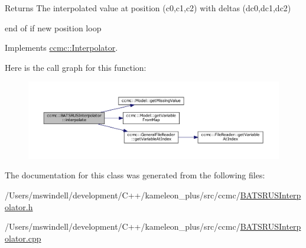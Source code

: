 \begin{DoxyReturn}{Returns}
The interpolated value at position (c0,c1,c2) with deltas (dc0,dc1,dc2) 
\end{DoxyReturn}
end of if new position loop 

Implements \hyperlink{classccmc_1_1_interpolator_aa6b272bd53630020d92938ec1e5cfad9}{ccmc\-::\-Interpolator}.



Here is the call graph for this function\-:
\nopagebreak
\begin{figure}[H]
\begin{center}
\leavevmode
\includegraphics[width=350pt]{classccmc_1_1_b_a_t_s_r_u_s_interpolator_a8bb4e9b10064a516192c771462673b09_cgraph}
\end{center}
\end{figure}




The documentation for this class was generated from the following files\-:\begin{DoxyCompactItemize}
\item 
/\-Users/mswindell/development/\-C++/kameleon\-\_\-plus/src/ccmc/\hyperlink{_b_a_t_s_r_u_s_interpolator_8h}{B\-A\-T\-S\-R\-U\-S\-Interpolator.\-h}\item 
/\-Users/mswindell/development/\-C++/kameleon\-\_\-plus/src/ccmc/\hyperlink{_b_a_t_s_r_u_s_interpolator_8cpp}{B\-A\-T\-S\-R\-U\-S\-Interpolator.\-cpp}\end{DoxyCompactItemize}
